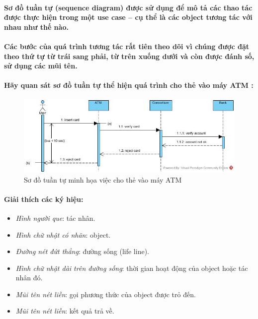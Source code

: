 \documentclass{article}
\begin{document}
  \paragraph{\textnormal{Sơ đồ tuần tự (sequence diagram) được sử dụng để mô tả các thao tác được thực hiện trong một use case -- cụ thể là các object tương tác với nhau như thế nào.}}

  \paragraph{\textnormal{Các bước của quá trình tương tác rất tiên theo dõi vì chúng được đặt theo thứ tự từ trái sang phải, từ trên xuống dưới và còn được đánh số, sử dụng các mũi tên.}}

  \paragraph{\textnormal{Hãy quan sát sơ đồ tuần tự thể hiện quá trình cho thẻ vào máy ATM :}}

  \begin{figure}[!ht]
    \centering
    \includegraphics[scale=0.5]{../pictures/diagrams/sequence/sequence-diagram-1.jpg}
    \caption{Sơ đồ tuần tự minh họa việc cho thẻ vào máy ATM}
  \end{figure}

  \paragraph{\textnormal{Giải thích các ký hiệu:}}
  
  \begin{itemize}
    \item \textit{Hình người que}: tác nhân.
    \item \textit{Hình chữ nhật có nhãn}: object.
    \item \textit{Đường nét đứt thẳng}: đường sống (life line).
    \item \textit{Hình chữ nhật dài trên đường sống}: thời gian hoạt động của object hoặc tác nhân đó.
    \item \textit{Mũi tên nét liền}: gọi phương thức của object được trỏ đến.
    \item \textit{Mũi tên nét liền}: kết quả trả về.
  \end{itemize}
\end{document}
